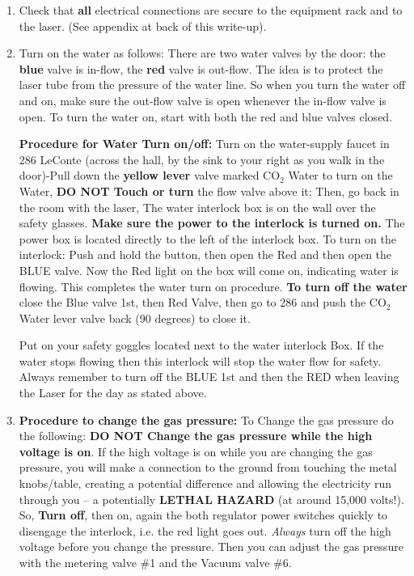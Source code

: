 \documentclass{../lab}
\begin{document}
\begin{enumerate}
    \item Check that \textbf{all} electrical connections are secure to the equipment rack and to the laser. (See appendix at back of this write-up).

    \item Turn on the water as follows: There are two water valves by the door: the \textbf{blue} valve is in-flow, the \textbf{red }valve is out-flow. The idea is to protect the laser tube from the pressure of the water line. So when you turn the water off and on, make sure the out-flow valve is open whenever the in-flow valve is open. To turn the water on, start with both the red and blue valves closed.
    
    \textbf{Procedure for Water Turn on/off:} Turn on the water-supply faucet in 286 LeConte (across the hall, by the sink to your right as you walk in the door)-Pull down the \textbf{yellow lever} valve marked CO$_2$ Water to turn on the Water, \textbf{DO NOT Touch or turn} the flow valve above it; Then, go back in the room with the laser, The water interlock box is on the wall over the safety glasses. \textbf{Make sure the power to the interlock is turned on.} The power box is located directly to the left of the interlock box. To turn on the interlock: Push and hold the button, then open the Red and then open the BLUE valve. Now the Red light on the box will come on, indicating water is flowing. This completes the water turn on procedure. \textbf{To turn off the water} close the Blue valve 1st, then Red Valve, then go to 286 and push the CO$_2$ Water lever valve back (90 degrees) to close it.
    
    Put on your safety goggles located next to the water interlock Box. If the water stops flowing then this interlock will stop the water flow for safety. Always remember to turn off the BLUE 1st and then the RED when leaving the Laser for the day as stated above.
    
    \item \textbf{Procedure to change the gas pressure:} To Change the gas pressure do the following: \textbf{DO NOT Change the gas pressure while the high voltage is on}.  If the high voltage is on while you are changing the gas pressure, you will make a connection to the ground from touching the metal knobs/table, creating a potential difference and allowing the electricity run through you -- a potentially \textbf{LETHAL HAZARD} (at around 15,000 volts!). So, \textbf{Turn off}, then on, again the both regulator power switches quickly to disengage the interlock, i.e. the red light goes out. \emph{Always} turn off the high voltage before you change the pressure. Then you can adjust the gas pressure with the metering valve \#1 and the Vacuum valve \#6.
    

\end{enumerate}
\end{document}
